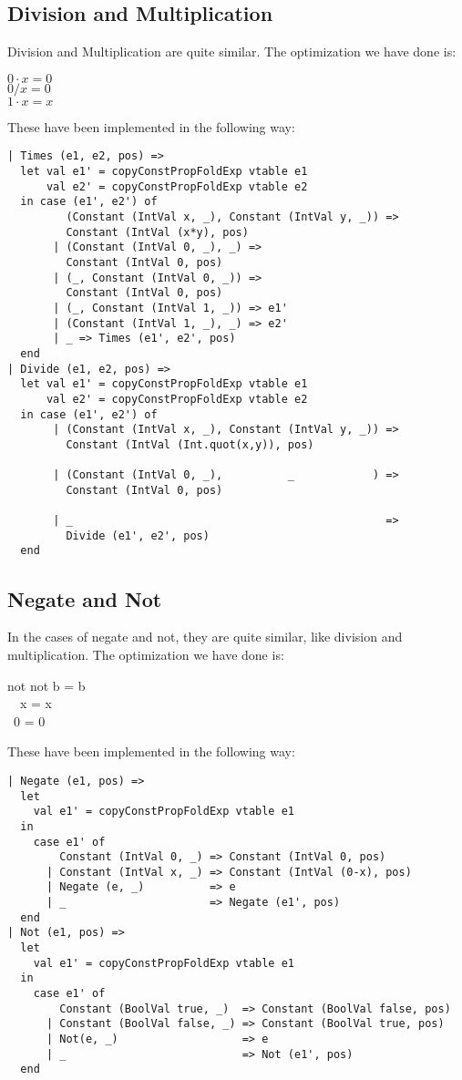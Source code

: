 \documentclass[12pt]{article}
\begin{document}
\subsection{Division and Multiplication}
Division and Multiplication are quite similar. The optimization we have done is:\\
\begin{center}
$0 \cdot x = 0$\\
$0/x = 0$\\
$1 \cdot x = x$
\end{center}
These have been implemented in the following way:
\begin{verbatim}
| Times (e1, e2, pos) =>
  let val e1' = copyConstPropFoldExp vtable e1
      val e2' = copyConstPropFoldExp vtable e2
  in case (e1', e2') of
         (Constant (IntVal x, _), Constant (IntVal y, _)) =>
         Constant (IntVal (x*y), pos)
       | (Constant (IntVal 0, _), _) =>
         Constant (IntVal 0, pos)
       | (_, Constant (IntVal 0, _)) =>
         Constant (IntVal 0, pos)
       | (_, Constant (IntVal 1, _)) => e1'
       | (Constant (IntVal 1, _), _) => e2'
       | _ => Times (e1', e2', pos)
  end
| Divide (e1, e2, pos) =>
  let val e1' = copyConstPropFoldExp vtable e1
      val e2' = copyConstPropFoldExp vtable e2
  in case (e1', e2') of
       | (Constant (IntVal x, _), Constant (IntVal y, _)) => 
         Constant (IntVal (Int.quot(x,y)), pos)

       | (Constant (IntVal 0, _),          _            ) => 
         Constant (IntVal 0, pos)
         
       | _                                                => 
         Divide (e1', e2', pos)
  end
\end{verbatim}

\subsection{Negate and Not}
In the cases of negate and not, they are quite similar, like division and multiplication. The optimization we have done is:\\
\begin{center}
not not b = b\\
~~x = x \\
~0 = 0
\end{center}
These have been implemented in the following way:
\begin{verbatim}
| Negate (e1, pos) =>
  let
    val e1' = copyConstPropFoldExp vtable e1
  in
    case e1' of
        Constant (IntVal 0, _) => Constant (IntVal 0, pos)
      | Constant (IntVal x, _) => Constant (IntVal (0-x), pos)
      | Negate (e, _)          => e
      | _                      => Negate (e1', pos)
  end 
| Not (e1, pos) =>
  let
    val e1' = copyConstPropFoldExp vtable e1
  in
    case e1' of
        Constant (BoolVal true, _)  => Constant (BoolVal false, pos)
      | Constant (BoolVal false, _) => Constant (BoolVal true, pos) 
      | Not(e, _)                   => e
      | _                           => Not (e1', pos)
  end 
\end{verbatim}
\end{document}
